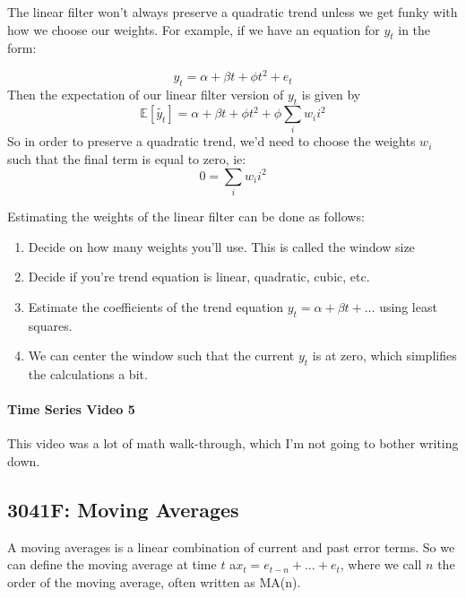 \documentclass[12pt]{article}
\begin{document}
        The linear filter won't always preserve a quadratic trend unless we get funky with
        how we choose our weights. For example, if we have an equation for $y_t$ in the
        form:

        \begin{equation*}
            y_t = \alpha + \beta t + \phi t^2 + e_t
        \end{equation*}
        Then the expectation of our linear filter version of $y_t$ is given by
        \begin{equation*}
            \mathbb{E}[\tilde{y_t}] = \alpha + \beta t + \phi t^2 + \phi \sum_i w_i i^2
        \end{equation*}
        So in order to preserve a quadratic trend, we'd need to choose the weights $w_i$ such
        that the final term is equal to zero, ie:
        \begin{equation*}
            0 = \sum_i w_i i^2
        \end{equation*}


        Estimating the weights of the linear filter can be done as follows:
        \begin{enumerate} 
            \item Decide on how many weights you'll use. This is called the window size
            \item Decide if you're trend equation is linear, quadratic, cubic, etc.
            \item Estimate the coefficients of the trend equation $y_t = \alpha + \beta t + \dots$ using least squares.
            \item We can center the window such that the current $y_t$ is at zero, which simplifies the calculations a bit.
        \end{enumerate} 

        \paragraph{Time Series Video 5} This video was a lot of math walk-through, which I'm not going to bother writing down.


        \subsection{3041F: Moving Averages}
        A moving averages is a linear combination of current and past error terms.
        So we can define the moving average at time $t$ a$x_t = e_{t-n} + \dots + e_t$, 
        where we call $n$ the order of the moving average, often written as MA(n).
\end{document}
